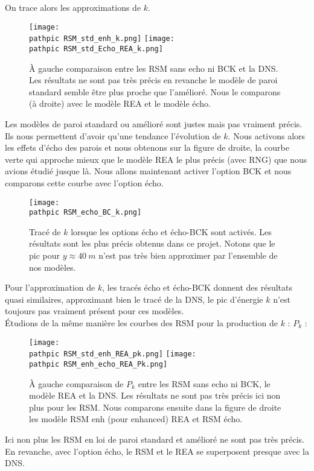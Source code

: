 \documentclass[a4paper,10pt]{article}
\newcommand\pathpic{/home/saura/Documents/Latex_files/Pic/}
\begin{document}
 On trace alors les approximations de $k$.
 
\begin{figure}[ht!]
\centering
\texttt{[image: \\pathpic RSM\_std\_enh\_k.png]} \hfill 
\texttt{[image: \\pathpic RSM\_std\_Echo\_REA\_k.png]} 
 \caption{À gauche comparaison entre les RSM sans echo ni BCK et la DNS. Les résultats ne sont pas très précis en revanche le modèle de paroi standard semble être plus proche que l'amélioré. Nous le comparons (à droite) avec le modèle REA et le modèle écho.}
 \label{RSM_k}
 \end{figure}

\noindent Les modèles de paroi standard ou amélioré sont justes mais pas vraiment précis. Ils nous permettent d'avoir qu'une tendance l'évolution de $k$. Nous activons alors les effets d'écho des parois et nous obtenons sur la figure de droite, la courbe verte qui approche mieux que le modèle REA le plus précis (avec RNG) que nous avions étudié jusque là. Nous allons maintenant activer l'option BCK et nous comparons cette courbe avec l'option écho.

\begin{figure}[ht!]
\centering
\texttt{[image: \\pathpic RSM\_echo\_BC\_k.png]}
\caption{Tracé de $k$ lorsque les options écho et écho-BCK sont activés. Les résultats sont les plus précis obtenus dans ce projet. Notons que le pic pour $ y \approx 40\ m$ n'est pas très bien approximer par l'ensemble de nos modèles.}
\label{RSM_k2}
\end{figure}
\noindent Pour l'approximation de $k$, les tracés écho et écho-BCK donnent des résultats quasi similaires, approximant bien le tracé de la DNS, le pic d'énergie $k$ n'est toujours pas vraiment présent pour ces modèles. \\
Étudions de la même manière les courbes des RSM pour la production de $k$ : $P_k$ :

\begin{figure}[ht!]
\centering
\texttt{[image: \\pathpic RSM\_std\_enh\_REA\_pk.png]} \hfill 
\texttt{[image: \\pathpic RSM\_enh\_echo\_REA\_Pk.png]} 
 \caption{À gauche comparaison de $P_k$ entre les RSM sans echo ni BCK, le modèle REA et la DNS. Les résultats ne sont pas très précis ici non plus pour les RSM. Nous comparons ensuite dans la figure de droite les modèle RSM enh (pour enhanced) REA et RSM écho.}
 \label{RSM_Pk}
 \end{figure}
 Ici non plus les RSM en loi de paroi standard et amélioré ne sont pas très précis. En revanche, avec l'option écho, le RSM et le REA se superposent presque avec la DNS. 
 
\end{document}
